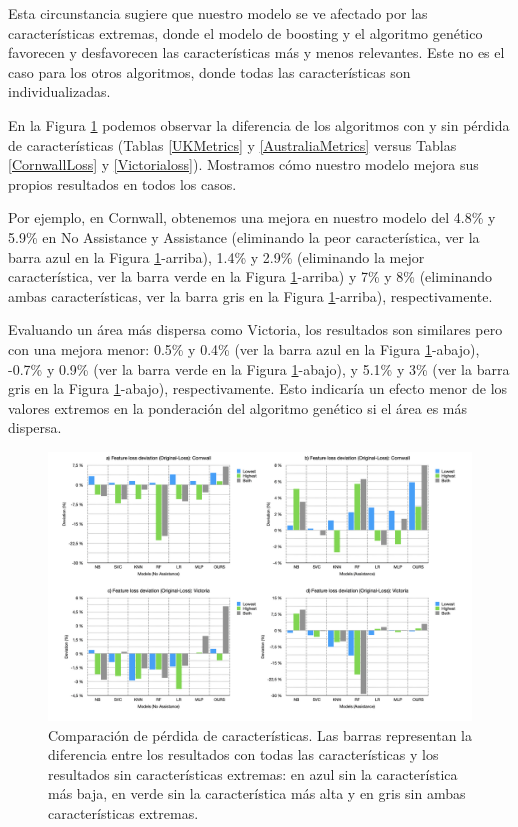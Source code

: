 \documentclass{uathesis-es}
\begin{document}
Esta circunstancia sugiere que nuestro modelo se ve afectado por las características extremas, donde el modelo de boosting y el algoritmo genético favorecen y desfavorecen las características más y menos relevantes. Este no es el caso para los otros algoritmos, donde todas las características son individualizadas.

En la Figura \ref{lossFig} podemos observar la diferencia de los algoritmos con y sin pérdida de características (Tablas \ref{UKMetrics} y \ref{AustraliaMetrics} versus Tablas \ref{CornwallLoss} y \ref{Victorialoss}). Mostramos cómo nuestro modelo mejora sus propios resultados en todos los casos.

Por ejemplo, en Cornwall, obtenemos una mejora en nuestro modelo del 4.8\% y 5.9\% en No Assistance y Assistance (eliminando la peor característica, ver la barra azul en la Figura \ref{lossFig}-arriba), 1.4\% y 2.9\% (eliminando la mejor característica, ver la barra verde en la Figura \ref{lossFig}-arriba) y 7\% y 8\% (eliminando ambas características, ver la barra gris en la Figura \ref{lossFig}-arriba), respectivamente.

Evaluando un área más dispersa como Victoria, los resultados son similares pero con una mejora menor: 0.5\% y 0.4\% (ver la barra azul en la Figura \ref{lossFig}-abajo), -0.7\% y 0.9\% (ver la barra verde en la Figura \ref{lossFig}-abajo), y 5.1\% y 3\% (ver la barra gris en la Figura \ref{lossFig}-abajo), respectivamente. Esto indicaría un efecto menor de los valores extremos en la ponderación del algoritmo genético si el área es más dispersa.

\begin{figure}[H]
	\centering
	\includegraphics[width=180mm]{Figures/LossFeatures/loss.png}
	\caption{Comparación de pérdida de características. Las barras representan la diferencia entre los resultados con todas las características y los resultados sin características extremas: en azul sin la característica más baja, en verde sin la característica más alta y en gris sin ambas características extremas.}
	\label{lossFig}
\end{figure}
\end{document}
